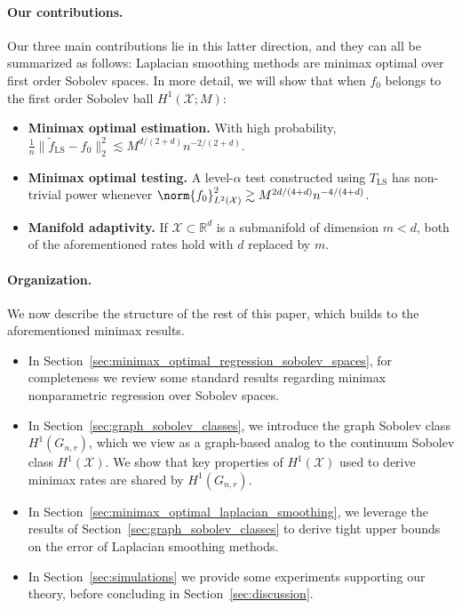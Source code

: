 \documentclass[twoside]{article}
\newcommand{\Reals}{\mathbb{R}}
\newcommand{\1}{\mathbf{1}}
\newcommand{\Rd}{\Reals^d}
\newcommand{\Xset}{\mathcal{X}}
\newcommand{\Leb}{L}
\newcommand{\mc}[1]{\mathcal{#1}}
\newcommand{\wt}[1]{\widetilde{#1}}
\newcommand{\LS}{\mathrm{LS}}
\theoremstyle{definition}
\theoremstyle{remark}
\begin{document}
\paragraph{Our contributions.} Our three main contributions lie in this latter direction, and they can all be summarized as follows: Laplacian smoothing methods are minimax optimal over first order Sobolev spaces. In more detail, we will show that when $f_0$ belongs to the first order Sobolev ball $H^1(\Xset;M)$:
\begin{itemize}
	\item \textbf{Minimax optimal estimation.} With high probability, $\frac{1}{n}\bigl\|\wt{f}_{\LS} - f_0\bigr\|_{2}^2 \lesssim M^{d/(2+d)}n^{-2/(2 + d)}$.
	\item \textbf{Minimax optimal testing.}
	A level-$\alpha$ test constructed using $T_{\LS}$ has non-trivial power whenever $\norm{f_0}_{\Leb^2(\Xset)}^2 \gtrsim M^{2d/(4 + d)}n^{-4/(4 + d)}$. 
	\item \textbf{Manifold adaptivity.}
	If $\mc{X} \subset \Rd$ is a submanifold of dimension $m < d$, both of the aforementioned rates hold with $d$ replaced by $m$.
\end{itemize}

\paragraph{Organization.} We now describe the structure of the rest of this paper, which builds to the aforementioned minimax results.
\begin{itemize}
	\item In Section~\ref{sec:minimax_optimal_regression_sobolev_spaces}, for completeness we review some standard results regarding minimax nonparametric regression over Sobolev spaces.
	\item In Section~\ref{sec:graph_sobolev_classes}, we introduce the graph Sobolev class $H^1(G_{n,r})$, which we view as a graph-based analog to the continuum Sobolev class $H^1(\Xset)$. We show that key properties of $H^1(\Xset)$ used to derive minimax rates are shared by $H^1(G_{n,r})$.
	\item In Section~\ref{sec:minimax_optimal_laplacian_smoothing}, we leverage the results of Section~\ref{sec:graph_sobolev_classes} to derive tight upper bounds on the error of Laplacian smoothing methods.
	\item In Section~\ref{sec:simulations} we provide some experiments supporting our theory, before concluding in Section~\ref{sec:discussion}.
\end{itemize}
\end{document}
